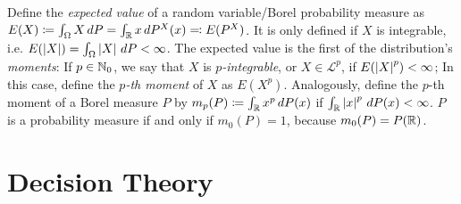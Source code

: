 \documentclass[a4paper]{scrreprt}
\theoremstyle{definition}
\begin{document}
    Define the \emph{expected value} of a random variable/Borel probability measure as $E(X) \coloneqq \int_{\Omega} X \, dP = \int_{\mathbb{R}} x \, dP^X(x) \eqqcolon E(P^X)$. It is only defined if $X$ is integrable, i.e. $E(\left| X \right|) = \int_{\Omega} \left| X \right| \, dP < \infty$. 
    The expected value is the first of the distribution's \emph{moments}:
    If $p \in \mathbb{N}_0$, we say that $X$ is \emph{$p$-integrable}, or $X \in \mathcal{L}^p$, if $E(\left| X \right|^p) < \infty$;
    In this case, define the \emph{$p$-th moment} of $X$ as $E(X^p)$. Analogously, define the $p$-th moment of a Borel measure $P$ by $m_p(P) \coloneqq \int_{\mathbb{R}} x^p \, dP(x)$ if $\int_{\mathbb{R}} \left| x \right|^p \, dP(x) < \infty$. $P$ is a probability measure if and only if $m_0(P) = 1$, because $m_0(P) = P(\mathbb{R})$.
    
    
    \section{Decision Theory}
    
    
\end{document}
